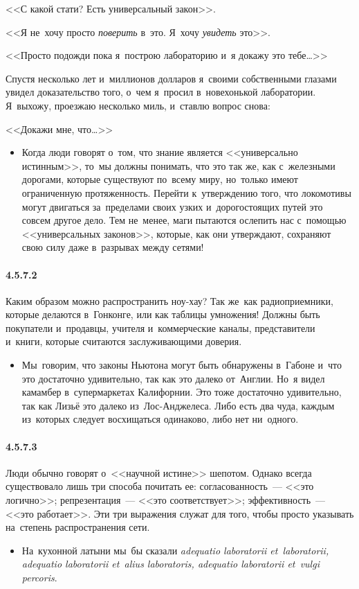 <<С какой стати? Есть универсальный закон>>.

<<Я не~хочу просто {\itshape поверить} в~это. Я~хочу {\itshape увидеть} это>>.

<<Просто подожди пока я~построю лабораторию и~я докажу это тебе\ldots>>

Спустя несколько лет и~миллионов долларов я~своими собственными глазами увидел доказательство того, о~чем я~просил в~новехонькой лаборатории. Я~выхожу, проезжаю несколько миль, и~ставлю вопрос снова:

<<Докажи мне, что\ldots>> 

	\begin{itemize}
	\item 
	Когда люди говорят о~том, что знание является <<универсально истинным>>, то~мы должны понимать, что это так же, как с~железными дорогами, которые существуют по~всему миру, но~только имеют ограниченную протяженность. Перейти к~утверждению того, что локомотивы могут двигаться за~пределами своих узких и~дорогостоящих путей это совсем другое дело. Тем не~менее, маги пытаются ослепить нас с~помощью <<универсальных законов>>, которые, как они утверждают, сохраняют свою силу даже в~разрывах между сетями!
	\end{itemize}

\paragraph{4.5.7.2}\hypertarget{par:4.5.7.2}{} Каким образом можно распространить ноу-хау? Так же~как радиоприемники, которые делаются в~Гонконге, или как таблицы умножения! Должны быть покупатели и~продавцы, учителя и~коммерческие каналы, представители и~книги, которые считаются заслуживающими доверия. 
	\begin{itemize}
	\item 
 Мы~говорим, что законы Ньютона могут быть обнаружены в~Габоне и~что это достаточно удивительно, так как это далеко от~Англии. Но~я видел камамбер в~супермаркетах Калифорнии. Это тоже достаточно удивительно, так как Лизьё это далеко из~Лос-Анджелеса. Либо есть два чуда, каждым из~которых следует восхищаться одинаково, либо нет ни~одного.
	\end{itemize}	

\paragraph{4.5.7.3}\hypertarget{par:4.5.7.3}{} Люди обычно говорят о~<<научной истине>> шепотом. Однако всегда существовало лишь три способа почитать ее: согласованность~--- <<это логично>>; репрезентация~--- <<это соответствует>>; эффективность~--- <<это работает>>. Эти три выражения служат для того, чтобы просто указывать на~степень распространения сети. 
	\begin{itemize}
	\item 
 На~кухонной латыни мы~бы сказали {\itshape adequatio laboratorii et~laboratorii, adequatio laboratorii et~alius laboratoris, adequatio laboratorii et~vulgi percoris}.
	\end{itemize}



